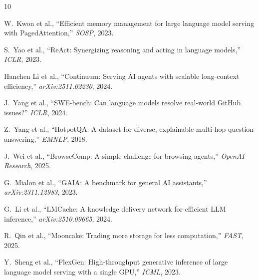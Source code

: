 \documentclass[10pt,twocolumn]{article}
\begin{document}
\footnotesize

\begin{thebibliography}{10}

W.~Kwon et al., ``Efficient memory management for large language model serving with PagedAttention,'' \emph{SOSP}, 2023.

S.~Yao et al., ``ReAct: Synergizing reasoning and acting in language models,'' \emph{ICLR}, 2023.

Hanchen Li et al., ``Continuum: Serving AI agents with scalable long-context efficiency,'' \emph{arXiv:2511.02230}, 2024.

J.~Yang et al., ``SWE-bench: Can language models resolve real-world GitHub issues?'' \emph{ICLR}, 2024.

Z.~Yang et al., ``HotpotQA: A dataset for diverse, explainable multi-hop question answering,'' \emph{EMNLP}, 2018.

J.~Wei et al., ``BrowseComp: A simple challenge for browsing agents,'' \emph{OpenAI Research}, 2025.

G.~Mialon et al., ``GAIA: A benchmark for general AI assistants,'' \emph{arXiv:2311.12983}, 2023.

G.~Li et al., ``LMCache: A knowledge delivery network for efficient LLM inference,'' \emph{arXiv:2510.09665}, 2024.

R.~Qin et al., ``Mooncake: Trading more storage for less computation,'' \emph{FAST}, 2025.

Y.~Sheng et al., ``FlexGen: High-throughput generative inference of large language model serving with a single GPU,'' \emph{ICML}, 2023.

\end{thebibliography}
\end{document}
